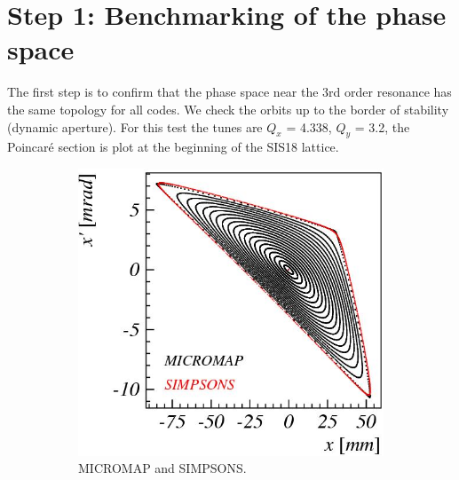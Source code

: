\documentclass[a4paper]{cernatsnote}
\begin{document}
\newpage

\section{Step 1: Benchmarking of the phase space}

The first step is to confirm that the phase space near the 3rd order resonance has the same topology for all codes. We check the orbits up to the border of stability (dynamic aperture). For this test the tunes are $Q_x$ = 4.338, $Q_y$ = 3.2, the Poincar\'{e} section is plot at the beginning of the SIS18 lattice. 

\begin{figure}
        \centering
        \begin{subfigure}{.5\textwidth}
          \centering
          \includegraphics[width=\textwidth]{Step1_phase-space.png}
          \caption{MICROMAP and SIMPSONS.}
          \label{fig:step1_m}
        \end{subfigure}~~~~~~
        \begin{subfigure}{.5\textwidth}
          \centering

\end{subfigure}
\end{figure}
\end{document}
